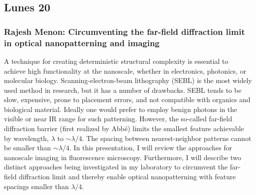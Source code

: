 
\subsection*{Lunes 20}

    \subsubsection*{Rajesh Menon: Circumventing the far-field diffraction limit
in optical nanopatterning and imaging}

A technique for creating deterministic structural complexity is essential to
achieve high functionality at the
nanoscale, whether in electronics, photonics, or molecular biology.
Scanning-electron-beam lithography (SEBL) is
the most widely used method in research, but it has a number of drawbacks. SEBL
tends to be slow, expensive,
prone to placement errors, and not compatible with organics and biological
material. Ideally one would prefer to
employ benign photons in the visible or near IR range for such patterning.
However, the so-called far-field
diffraction barrier (first realized by Abb\'e) limits the smallest feature
achievable by wavelength, $\lambda$ to $\sim \lambda / 4$. The
spacing between nearest-neighbor patterns cannot be smaller than $\sim \lambda /
4$.
In this presentation, I will review the approaches for nanoscale imaging in
fluorescence microscopy.
Furthermore, I will describe two distinct approaches being investigated in my
laboratory to circumvent the far-field
diffraction limit and thereby enable optical nanopatterning with feature
spacings smaller than $\lambda / 4$.

